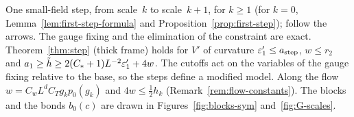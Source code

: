 \begin{gfigure}[tbp]
\caption{One small-field step, from scale~$k$ to scale~$k+1$, for $k\ge1$ (for $k=0$, Lemma~\ref{lem:first-step-formula} and Proposition~\ref{prop:first-step}); follow the arrows. The gauge fixing and the elimination of the constraint are exact. Theorem~\ref{thm:step} (thick frame) holds for $V'$ of curvature $\eps'_1\le a_{\rm step}$, $w\le r_2$ and $a_1\ge\tilde h\ge2(C_*+1)L^{-2}\eps'_1+4w$. The cutoffs act on the variables of the gauge fixing relative to the base, so the steps define a modified model. Along the flow $w=C_wL^dC_Tg_kp_0(g_k)$ and $4w\le\frac12h_k$ (Remark~\ref{rem:flow-constants}). The blocks and the bonds $b_0(c)$ are drawn in Figures~\ref{fig:blocks-sym} and~\ref{fig:G-scales}.}
\label{fig:G-step}
\end{gfigure}
